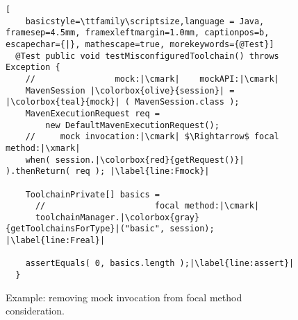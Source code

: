 \begin{figure}[h]
	\begin{lstlisting}[
	basicstyle=\ttfamily\scriptsize,language = Java, framesep=4.5mm, framexleftmargin=1.0mm, captionpos=b, escapechar={|}, mathescape=true, morekeywords={@Test}]
  @Test public void testMisconfiguredToolchain() throws Exception {
    //                mock:|\cmark|    mockAPI:|\cmark|
    MavenSession |\colorbox{olive}{session}| = |\colorbox{teal}{mock}| ( MavenSession.class );
    MavenExecutionRequest req =
        new DefaultMavenExecutionRequest();
    //     mock invocation:|\cmark| $\Rightarrow$ focal method:|\xmark|
    when( session.|\colorbox{red}{getRequest()}| ).thenReturn( req ); |\label{line:Fmock}|

    ToolchainPrivate[] basics =
      //                      focal method:|\cmark|
      toolchainManager.|\colorbox{gray}{getToolchainsForType}|("basic", session); |\label{line:Freal}|

    assertEquals( 0, basics.length );|\label{line:assert}|
  }
  \end{lstlisting}

  \caption{Example: removing mock invocation from focal method consideration.}
  \label{fig:mockExampleEvaluation}
\end{figure}
